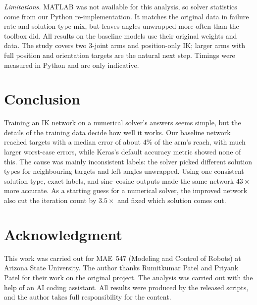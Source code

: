 \documentclass[conference]{IEEEtran}
\begin{document}
\emph{Limitations.} MATLAB was not available for this analysis, so solver statistics come from our Python re-implementation. It matches the original data in failure rate and solution-type mix, but leaves angles unwrapped more often than the toolbox did. All results on the baseline models use their original weights and data. The study covers two 3-joint arms and position-only IK; larger arms with full position and orientation targets are the natural next step. Timings were measured in Python and are only indicative.

\section{Conclusion}

Training an IK network on a numerical solver's answers seems simple, but the details of the training data decide how well it works. Our baseline network reached targets with a median error of about 4\% of the arm's reach, with much larger worst-case errors, while Keras's default accuracy metric showed none of this. The cause was mainly inconsistent labels: the solver picked different solution types for neighbouring targets and left angles unwrapped. Using one consistent solution type, exact labels, and sine--cosine outputs made the same network $43\times$ more accurate. As a starting guess for a numerical solver, the improved network also cut the iteration count by $3.5\times$ and fixed which solution comes out.

\section*{Acknowledgment}
This work was carried out for MAE~547 (Modeling and Control of Robots) at Arizona State University. The author thanks Rumitkumar Patel and Priyank Patel for their work on the original project. The analysis was carried out with the help of an AI coding assistant. All results were produced by the released scripts, and the author takes full responsibility for the content.



\end{document}
